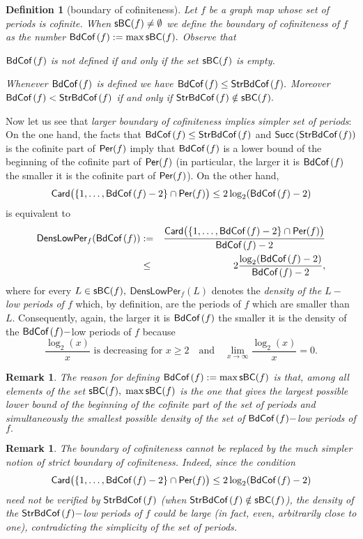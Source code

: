 \documentclass[a4paper, 11pt]{amsart}
\newenvironment{widthitemize}{\list{\textbullet}{\labelwidth=2ex\leftmargin=2.25ex}}{\endlist}
\numberwithin{equation}{section}
\theoremstyle{customnumberedtheorem}
\theoremstyle{definitionwithbfnote}
\newtheorem{definition}[theorem]{Definition}
\newtheorem{remark}[theorem]{Remark}
\DeclareMathOperator{\bc}{\textsf{\upshape BdCof\,}}
\DeclareMathOperator{\sbc}{\textsf{\upshape StrBdCof\,}}
\DeclareMathOperator{\Per}{\textsf{\upshape Per}}
\DeclareMathOperator{\Card}{\textsf{\upshape Card}}
\DeclareMathOperator{\Succ}{\textsf{\upshape Succ}}
\DeclareMathOperator{\sbcset}{\textsf{\upshape sBC}}
\newcommand{\succs}[1]{\ensuremath{\Succ\left(#1\right)}}
\newcommand{\andq}[1][and]{\ensuremath{\quad\text{#1}\quad}}
\begin{document}
\begin{definition}[boundary of cofiniteness]\label{SCB}
Let $f$ be a graph map whose set of periods is cofinite.
When $\sbcset(f) \ne \emptyset$ we define the
\emph{boundary of cofiniteness of $f$ \/} as
the number $\bc(f) := \max \sbcset(f).$
Observe that
\begin{widthitemize}
\item $\bc(f)$ is not defined if and only if the set $\sbcset(f)$ is empty.
\item Whenever $\bc(f)$ is defined we have $\bc(f) \le \sbc(f).$
      Moreover $\bc(f) < \sbc(f)$ if and only if $\sbc(f) \notin \sbcset(f).$
\end{widthitemize}
\end{definition}

Now let us see that \emph{larger boundary of cofiniteness implies
simpler set of periods}:
On the one hand, the facts that $\bc(f) \le \sbc(f)$ and
$\succs{\sbc(f)}$ is the  cofinite part of $\Per(f)$
imply that $\bc(f)$ is a lower bound of the beginning of the
cofinite part of $\Per(f)$
(in particular, the larger it is $\bc(f)$ the smaller it is the
cofinite part of $\Per(f)$).
On the other hand,
\[
 \Card\bigl(\{1,\ldots, \bc(f)-2\}\cap \Per(f)\bigr) \le 2 \log_2(\bc(f)-2)
\]
is equivalent to
\begin{eqnarray*}
 \textsf{DensLowPer}_f(\bc(f))
    & :=  & \frac{\Card\bigl(\{1,\ldots, \bc(f)-2\}\cap \Per(f)\bigr)}{\bc(f)-2}\\
    & \le & 2\frac{\log_2(\bc(f)-2)}{\bc(f)-2},
\end{eqnarray*}
where for every $L \in \sbcset(f),$
$\textsf{DensLowPer}_f(L)$ denotes the \emph{density of the
$L-$low periods of $f$} which, by definition, are the
periods of $f$ which are smaller than $L.$
Consequently, again, the larger it is $\bc(f)$ the smaller it is
the density of the $\bc(f)-$low periods of $f$ because
\[
      \frac{\log_2(x)}{x}\text{ is decreasing for $x \ge 2$}
      \andq
      \lim_{x\to\infty} \frac{\log_2(x)}{x} = 0.
\]

\begin{remark}
The reason for defining $\bc(f):=\max \sbcset(f)$ is that,
among all elements of the set $\sbcset(f),$ $\max \sbcset(f)$ is the
one that gives
the largest possible lower bound of the beginning of the cofinite part
of the set of periods
and \emph{simultaneously}
the smallest possible density of the set of $\bc(f)-$low periods of $f.$
\end{remark}

\begin{remark}\label{NotSBC}
The boundary of cofiniteness cannot be replaced by the
much simpler notion of strict boundary of cofiniteness.
Indeed, since the condition
\[
 \Card\bigl(\{1,\ldots, \bc(f)-2\}\cap \Per(f)\bigr) \le 2 \log_2(\bc(f)-2)
\]
need not be verified by $\sbc(f)$ (when $\sbc(f) \notin \sbcset(f)$),
the density of the $\sbc(f)-$low periods of $f$
could be large (in fact, even, arbitrarily close to one),
contradicting the simplicity of the set of periods.
\end{remark}
\end{document}
